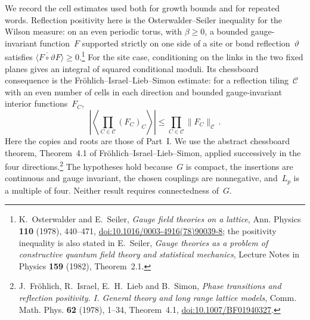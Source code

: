 We record the cell estimates used both for growth bounds and for repeated words. Reflection positivity here is the Osterwalder--Seiler inequality for the Wilson measure: on an even periodic torus, with $\beta\ge0$, a bounded gauge-invariant function~$F$ supported strictly on one side of a site or bond reflection~$\vartheta$ satisfies $\langle\overline{F\circ\vartheta}F\rangle\ge0$.\footnote{K.~Osterwalder and E.~Seiler, \emph{Gauge field theories on a lattice}, Ann. Physics \textbf{110} (1978), 440--471, \href{https://doi.org/10.1016/0003-4916(78)90039-8}{doi:10.1016/0003-4916(78)90039-8}; the positivity inequality is also stated in E.~Seiler, \emph{Gauge theories as a problem of constructive quantum field theory and statistical mechanics}, Lecture Notes in Physics \textbf{159} (1982), Theorem~2.1.} For the site case, conditioning on the links in the two fixed planes gives an integral of squared conditional moduli. Its chessboard consequence is the Fr\"ohlich--Israel--Lieb--Simon estimate: for a reflection tiling~$\mathcal C$ with an even number of cells in each direction and bounded gauge-invariant interior functions~$F_C$,
\begin{equation}\label{eq:F-chessboard}
\left|\left\langle\prod_{C\in\mathcal C}(F_C)_C\right\rangle\right|\le\prod_{C\in\mathcal C}\|F_C\|_{\mathcal C}\,.
\end{equation}
Here the copies and roots are those of Part~I. We use the abstract chessboard theorem, Theorem~4.1 of Fr\"ohlich--Israel--Lieb--Simon, applied successively in the four directions.\footnote{J.~Fr\"ohlich, R.~Israel, E.~H.~Lieb and B.~Simon, \emph{Phase transitions and reflection positivity. I. General theory and long range lattice models}, Comm. Math. Phys. \textbf{62} (1978), 1--34, Theorem~4.1, \href{https://doi.org/10.1007/BF01940327}{doi:10.1007/BF01940327}.} The hypotheses hold because~$G$ is compact, the insertions are continuous and gauge invariant, the chosen couplings are nonnegative, and~$L_p$ is a multiple of four. Neither result requires connectedness of~$G$.

